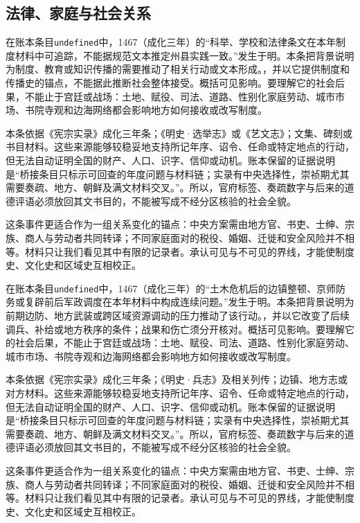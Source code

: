 \subsection{法律、家庭与社会关系}

在账本条目\texttt{undefined}中，1467（成化三年）的“科举、学校和法律条文在本年制度材料中可追踪，不能据规范文本推定州县实践一致。”发生于明。本条把背景说明为制度、教育或知识传播的需要推动了相关行动或文本形成。，并以它提供制度和传播史的锚点，不能据此推断社会整体接受。概括可见影响。要理解它的社会后果，不能止于宫廷或战场：土地、赋役、司法、道路、性别化家庭劳动、城市市场、书院寺观和边海网络都会影响地方如何接收或改写制度。

本条依据《宪宗实录》成化三年条；《明史·选举志》或《艺文志》；文集、碑刻或书目材料。这些来源能够较稳妥地支持所记年序、诏令、任命或特定地点的行动，但无法自动证明全国的财产、人口、识字、信仰或动机。账本保留的证据说明是“桥接条目只标示可回查的年度问题与材料链；实录有中央选择性，崇祯期尤其需要奏疏、地方、朝鲜及满文材料交叉。”。所以，官府标签、奏疏数字与后来的道德评语必须放回其文书目的，不能被写成不经分区核验的社会全貌。

这条事件更适合作为一组关系变化的锚点：中央方案需由地方官、书吏、士绅、宗族、商人与劳动者共同转译；不同家庭面对的税役、婚姻、迁徙和安全风险并不相等。材料只让我们看见其中有限的记录者。承认可见与不可见的界线，才能使制度史、文化史和区域史互相校正。

在账本条目\texttt{undefined}中，1467（成化三年）的“土木危机后的边镇整顿、京师防务或复辟前后军政调度在本年材料中构成连续问题。”发生于明。本条把背景说明为前期边防、地方武装或跨区域资源调动的压力推动了该行动。，并以它改变了后续调兵、补给或地方秩序的条件；战果和伤亡须分开核对。概括可见影响。要理解它的社会后果，不能止于宫廷或战场：土地、赋役、司法、道路、性别化家庭劳动、城市市场、书院寺观和边海网络都会影响地方如何接收或改写制度。

本条依据《宪宗实录》成化三年条；《明史·兵志》及相关列传；边镇、地方志或对方材料。这些来源能够较稳妥地支持所记年序、诏令、任命或特定地点的行动，但无法自动证明全国的财产、人口、识字、信仰或动机。账本保留的证据说明是“桥接条目只标示可回查的年度问题与材料链；实录有中央选择性，崇祯期尤其需要奏疏、地方、朝鲜及满文材料交叉。”。所以，官府标签、奏疏数字与后来的道德评语必须放回其文书目的，不能被写成不经分区核验的社会全貌。

这条事件更适合作为一组关系变化的锚点：中央方案需由地方官、书吏、士绅、宗族、商人与劳动者共同转译；不同家庭面对的税役、婚姻、迁徙和安全风险并不相等。材料只让我们看见其中有限的记录者。承认可见与不可见的界线，才能使制度史、文化史和区域史互相校正。

